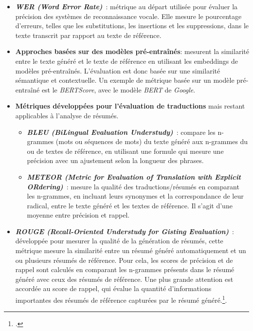 \begin{itemize}[label=\textbullet]
	\item \textbf{\emph{WER (Word Error Rate)}}~: métrique au départ utilisée pour évaluer la précision des 
	systèmes de reconnaissance vocale. Elle mesure le pourcentage d'erreurs, telles que les substitutions, 
	les insertions et les suppressions, dans le texte transcrit par rapport au texte de référence.
	\item \textbf{Approches basées sur des modèles pré-entraînés}: mesurent la similarité entre le texte généré et le texte de référence en utilisant les
		\gls{embeddings} de modèles pré-entraînés. L'évaluation est donc basée sur une similarité sémantique et contextuelle. Un exemple de métrique basée
		sur un modèle pré-entraîné est le \emph{BERTScore}, avec le modèle \emph{BERT} de \emph{Google}.

	\item \textbf{Métriques développées pour l'évaluation de traductions} mais restant applicables à l'analyse de résumés.
			\begin{itemize}[label=\textopenbullet]
				\item \textbf{\emph{BLEU (BiLingual Evaluation Understudy)}}~: compare les n-grammes (mots ou séquences de mots) du texte généré aux n-grammes du ou de textes de référence, en utilisant une formule qui mesure une précision avec un ajustement selon la longueur des phrases.
				\item \textbf{\emph{METEOR (Metric for Evaluation of Translation with Explicit ORdering)}}~: mesure la qualité des traductions/résumés en comparant les n-grammes, en incluant leurs synonymes et la correspondance de leur radical, entre le texte généré et les textes de référence. Il s'agit d'une moyenne entre précision et rappel.	
			\end{itemize}
	
	\item \textbf{\emph{ROUGE (Recall-Oriented Understudy for Gisting Evaluation)}}~: développée pour mesurer la qualité de la génération de résumés, cette métrique mesure la similarité
	entre un résumé généré automatiquement et un ou plusieurs résumés de référence. Pour cela, les scores de précision et de rappel sont calculés
	en comparant les n-grammes présents dans le résumé généré avec ceux des résumés de référence.
	Une plus grande attention est accordée au score de rappel, qui évalue la quantité d'informations importantes des résumés de référence capturées par le résumé généré.\footcite{noauthor_large_2023}.
\end{itemize}

